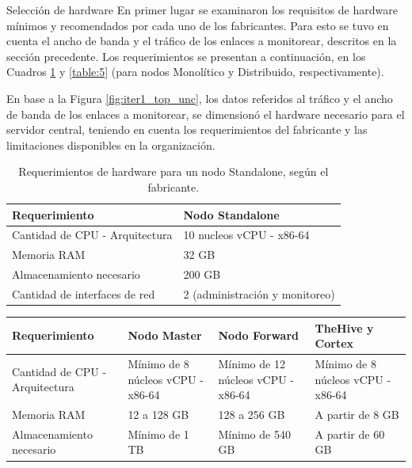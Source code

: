     \begin{subsection}{Selección de hardware}
    \label{seleccion_hw}
    En primer lugar se examinaron los requisitos de hardware mínimos y recomendados por cada uno de los fabricantes. Para esto se tuvo en cuenta el ancho de banda y el tráfico de los enlaces a monitorear, descritos en la sección precedente. Los requerimientos se presentan a continuación, en los Cuadros \ref{table:15} y \ref{table:5} (para nodos Monolítico y Distribuido, respectivamente). \par
    En base a la Figura \ref{fig:iter1_top_unc}, los datos referidos al tráfico y el ancho de banda de los enlaces a monitorear, se dimensionó el hardware necesario para el servidor central, teniendo en cuenta los requerimientos del fabricante y las limitaciones disponibles en la organización.\par
    \begin{table}[H]
    \centering
    \begin{tabular}{|m{10em}|m{10em}|}
    \hline 
    Requerimiento  & Nodo Standalone \\ 
    \hline
    Cantidad de CPU - Arquitectura &  10 nucleos vCPU - x86-64  \\ \hline
    Memoria RAM  &  32 GB  \\ 
    \hline
    Almacenamiento necesario   & 200 GB  \\
    \hline
    Cantidad de interfaces de red  & 2 (administración y monitoreo) \\
    \hline %
    \end{tabular}
    \caption{Requerimientos de hardware para un nodo Standalone, según el fabricante.}
    \label{table:15}
    \end{table}
    \begin{table}[H]
    \centering
    \begin{tabular}{|m{9em}|m{9em}|m{9em}|m{9em}|}
    \hline 
    Requerimiento  & Nodo Master &  Nodo Forward & TheHive y Cortex \\ 
    \hline
    Cantidad de CPU - Arquitectura & Mínimo de 8 núcleos vCPU - x86-64 & Mínimo de 12 núcleos vCPU - x86-64 & Mínimo de 8 núcleos vCPU - x86-64 \\ 
    \hline
    Memoria RAM  & 12 a 128 GB & 128 a 256 GB & A partir de 8 GB \\ 
    \hline
    Almacenamiento necesario & Mínimo de 1 TB  & Mínimo de 540 GB & A partir de 60 GB \\

\end{tabular}
\end{table}
\end{subsection}
